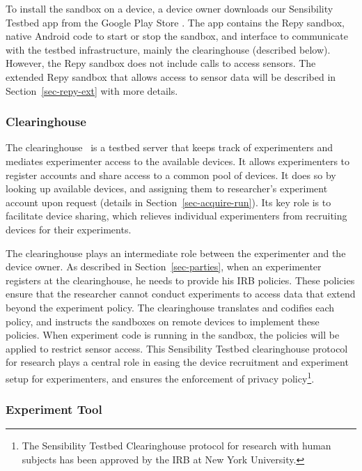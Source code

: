 To install the sandbox on a device, a device owner downloads 
our Sensibility Testbed app from the Google Play Store \cite{sensibility-app}.
The app contains the Repy sandbox, native Android code to 
start or stop the sandbox, and interface to communicate with the testbed 
infrastructure, mainly the clearinghouse (described below). 
However, the Repy sandbox does not include calls to access sensors. 
The extended Repy sandbox that allows access to sensor 
data will be described in Section~\ref{sec-repy-ext} with more details.

\subsubsection{Clearinghouse}\label{sec-ch}
The clearinghouse~\cite{ch} is a testbed server that keeps track of 
experimenters and mediates experimenter access to the 
available devices. It allows experimenters to register 
accounts and share access to a common pool of devices.
It does so by looking up available devices, and assigning
them to researcher's experiment account upon request 
(details in Section~\ref{sec-acquire-run}). 
Its key role is to facilitate device sharing, 
which relieves individual experimenters from recruiting 
devices for their experiments.

The clearinghouse
plays an intermediate role between the experimenter and 
the device owner.
As described in Section~\ref{sec-parties}, when an 
experimenter registers at the clearinghouse, he
needs to provide his IRB policies. These policies ensure that
the researcher cannot conduct experiments to access data that
extend beyond the experiment policy. The clearinghouse 
translates and codifies each policy, and instructs the 
sandboxes on remote devices to implement these policies. 
When experiment code is running in the sandbox, the 
policies will be applied to restrict %
sensor access. This Sensibility Testbed
clearinghouse protocol for research plays a central role in
easing the device recruitment and experiment setup for experimenters, 
and ensures the enforcement
of privacy policy\footnote{The Sensibility Testbed Clearinghouse
protocol for research with human subjects has been approved by
the IRB at New York University. }. 

\subsubsection{Experiment Tool}\label{sec-emt}

